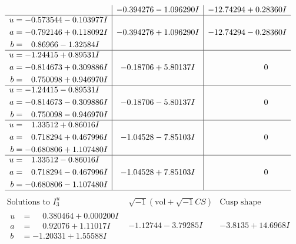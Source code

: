 \documentclass[1p]{elsarticle_modified}
\theoremstyle{definition}
\newcommand{\I}{\sqrt{-1}}
\begin{document}
$$\begin{array}{c|c|c}
 & -0.394276 - 1.096290 I & -12.74294 + 0.28360 I \\ \hline\begin{aligned}
u &= -0.573544 - 0.103977 I \\
a &= -0.792146 + 0.118092 I \\
b &= \phantom{-}0.86966 - 1.32584 I\end{aligned}
 & -0.394276 + 1.096290 I & -12.74294 - 0.28360 I \\ \hline\begin{aligned}
u &= -1.24415 + 0.89531 I \\
a &= -0.814673 + 0.309886 I \\
b &= \phantom{-}0.750098 + 0.946970 I\end{aligned}
 & -0.18706 + 5.80137 I & \phantom{-0.000000 } 0 \\ \hline\begin{aligned}
u &= -1.24415 - 0.89531 I \\
a &= -0.814673 - 0.309886 I \\
b &= \phantom{-}0.750098 - 0.946970 I\end{aligned}
 & -0.18706 - 5.80137 I & \phantom{-0.000000 } 0 \\ \hline\begin{aligned}
u &= \phantom{-}1.33512 + 0.86016 I \\
a &= \phantom{-}0.718294 + 0.467996 I \\
b &= -0.680806 + 1.107480 I\end{aligned}
 & -1.04528 - 7.85103 I & \phantom{-0.000000 } 0 \\ \hline\begin{aligned}
u &= \phantom{-}1.33512 - 0.86016 I \\
a &= \phantom{-}0.718294 - 0.467996 I \\
b &= -0.680806 - 1.107480 I\end{aligned}
 & -1.04528 + 7.85103 I & \phantom{-0.000000 } 0\\
 \hline 
 \end{array}$$\newpage$$\begin{array}{c|c|c}  
\text{Solutions to }I^u_{3}& \I (\text{vol} + \sqrt{-1}CS) & \text{Cusp shape}\\
 \hline 
\begin{aligned}
u &= \phantom{-}0.380464 + 0.000200 I \\
a &= \phantom{-}0.92076 + 1.11017 I \\
b &= -1.20331 + 1.55588 I\end{aligned}
 & -1.12744 - 3.79285 I & -3.8135 + 14.6968 I \\ \hline\begin{aligned}

\end{aligned}
\end{array}$$
\end{document}
